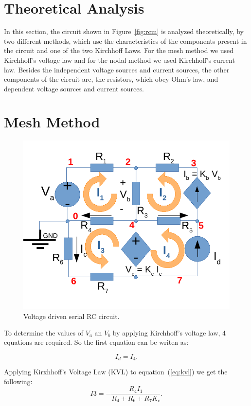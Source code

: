 \section{Theoretical Analysis}
\label{sec:analysis}

In this section, the circuit shown in Figure~\ref{fig:rcm} is analyzed
theoretically, by two different methods, which use the characteristics of the components present in the circuit and one of the two Kirchhoff Laws.
For the mesh method we used Kirchhoff's voltage law and for the nodal method we used Kirchhoff's current law.
Besides the independent voltage sources and current sources, the other components of the circuit are, the resistors, which obey Ohm's law, and dependent voltage sources and current sources.

\section{Mesh Method}

\begin{figure}[h] \centering
\includegraphics[width=0.6\linewidth]{mesh_diagram.pdf}
\caption{Voltage driven serial RC circuit.}
\label{fig:rc}
\end{figure}


To determine the values of $V_a$ an $V_b$ by applying Kirchhoff's voltage law, 4 equations are required. So the first equation can be writen as:

\begin{equation}
  I_d = I_4.
  \label{eq:kvl}
\end{equation}

Applying Kirxhhoff's Voltage Law (KVL) to equation~(\ref{eq:kvl}) we get the following:
\begin{equation}
  I3 = -\frac{R_4I_1}{R_4 + R_6 + R_7K_c}.
\end{equation}

